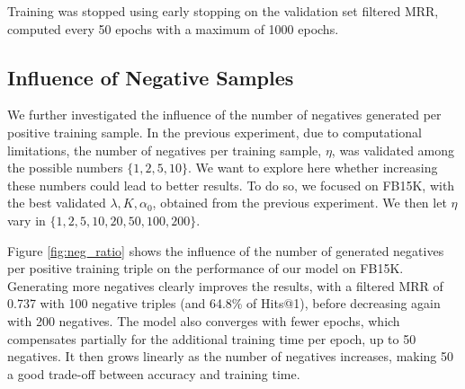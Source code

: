 \documentclass{article}
\newcommand{\rank}{K} %
\newcommand{\Johans}[1]{\todo[inline,backgroundcolor=green!20!green]{Johans: #1}}
\begin{document}
Training was stopped using early stopping on the validation set filtered MRR, computed every 50 epochs with a maximum of 1000 epochs.

\subsection{Influence of Negative Samples}
We further investigated the influence of the number of negatives generated per positive training sample. In the previous experiment, due to computational limitations, the number of negatives per training sample, $\eta$, was validated among the possible numbers $\{1, 2, 5, 10\}$. We want to explore here whether increasing these numbers could lead to better results. To do so, we focused on FB15K, with the best validated $\lambda,\rank,\alpha_0$, obtained from the previous experiment. We then let $\eta$ vary in $\{1, 2, 5, 10, 20, 50, 100, 200\}$.



Figure \ref{fig:neg_ratio} shows the influence of the number of generated negatives per positive training triple on the performance of our model on FB15K.
Generating more negatives clearly improves the results, with a filtered MRR of 0.737  with 100 negative triples (and 64.8\% of Hits@1), before decreasing again with 200 negatives. The model also converges with fewer epochs, which compensates partially for the additional training time per epoch, up to 50 negatives. It then grows linearly as the number of negatives increases, making 50 a good trade-off between accuracy and training time. %
\end{document}
